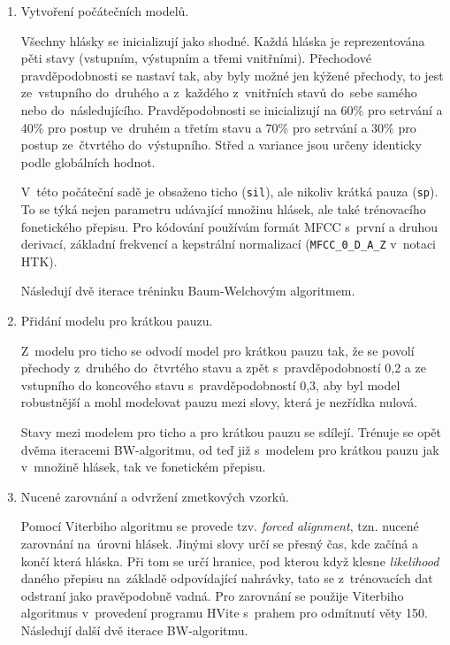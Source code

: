 \begin{enumerate}

\item{Vytvoření počátečních modelů.}

Všechny hlásky se inicializují jako
shodné. Každá hláska je reprezentována pěti stavy (vstupním, výstupním a třemi
vnitřními). Přechodové pravděpodobnosti se nastaví tak, aby byly možné jen
kýžené přechody, to jest ze~vstupního do~druhého a z~každého z~vnitřních stavů
do~sebe samého nebo do~následujícího. Pravděpodobnosti
se inicializují na 60\% pro setrvání a 40\% pro postup ve~druhém a
třetím stavu a 70\% pro setrvání a 30\% pro postup ze~čtvrtého do~výstupního.
Střed a variance jsou určeny identicky podle globálních hodnot.

V~této počáteční sadě je obsaženo ticho (\texttt{sil}), ale nikoliv krátká pauza
(\texttt{sp}). To se týká nejen parametru udávající množinu hlásek, ale také
trénovacího fonetického přepisu.
Pro kódování používám formát MFCC s~první a druhou derivací, základní frekvencí
a kepstrální normalizací (\texttt{MFCC\_0\_D\_A\_Z} v~notaci HTK).

Následují dvě iterace tréninku Baum-Welchovým algoritmem.

\item{Přidání modelu pro krátkou pauzu.}

Z~modelu pro ticho se odvodí model pro krátkou pauzu tak, že se povolí přechody
z~druhého do~čtvrtého stavu a zpět s~pravděpodobností 0,2 a ze vstupního do
koncového stavu s~pravděpodobností 0,3, aby byl model robustnější a mohl
modelovat pauzu mezi slovy, která je nezřídka nulová.

Stavy mezi modelem pro ticho a pro krátkou pauzu se sdílejí.
Trénuje se opět dvěma iteracemi BW-algoritmu, od teď již s~modelem pro krátkou
pauzu jak v~množině hlásek, tak ve fonetickém přepisu.

\item{Nucené zarovnání a odvržení zmetkových vzorků.}

Pomocí Viterbiho algoritmu\cite{forney1973viterbi} se provede tzv.
\textit{forced alignment}, tzn. nucené zarovnání na~úrovni hlásek. Jinými slovy
určí se přesný čas, kde začíná a končí která hláska. Při tom se určí hranice, pod
kterou když klesne \textit{likelihood} daného přepisu na~základě odpovídající
nahrávky, tato se z~trénovacích dat odstraní jako pravěpodobně vadná. Pro
zarovnání se použije Viterbiho algoritmus v~provedení programu HVite s~prahem
pro odmítnutí věty 150. Následují další dvě iterace BW-algoritmu.


\end{enumerate}
